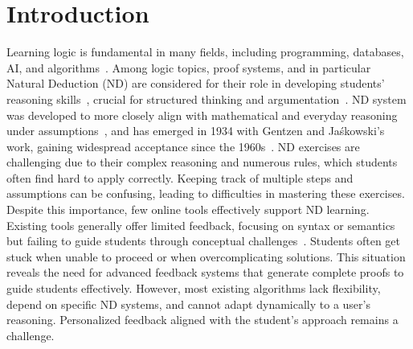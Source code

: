 
\section{Introduction}

Learning logic is fundamental in many fields, including programming, databases, AI, and algorithms~\cite{logicincomputer}. Among logic topics, proof systems, and in particular Natural Deduction (ND) are considered for their role in developing students’ reasoning skills~\cite{IJCAI13}, crucial for structured thinking and argumentation~\cite{vonPlato_2014}. ND system was developed to more closely align with mathematical and everyday reasoning under assumptions~\cite{nd-mancosu}, and has  emerged in 1934 with Gentzen and Jaśkowski's work, gaining widespread acceptance since the 1960s~\cite{Pelletier1999-FRAABH}.
ND exercises are challenging due to their complex reasoning and numerous rules, which students often find hard to apply correctly. Keeping track of multiple steps and assumptions can be confusing, leading to difficulties in mastering these exercises.
Despite this importance, few online tools effectively support ND learning. Existing tools generally offer limited feedback, focusing on syntax or semantics but failing to guide students through conceptual challenges~\cite{Perh__2025}. Students often get stuck when unable to proceed or when overcomplicating solutions. This situation reveals the need for advanced feedback systems that generate complete proofs to guide students effectively. However, most existing algorithms lack flexibility, depend on specific ND systems, and cannot adapt dynamically to a user’s reasoning. Personalized feedback aligned with the student’s approach remains a challenge.

